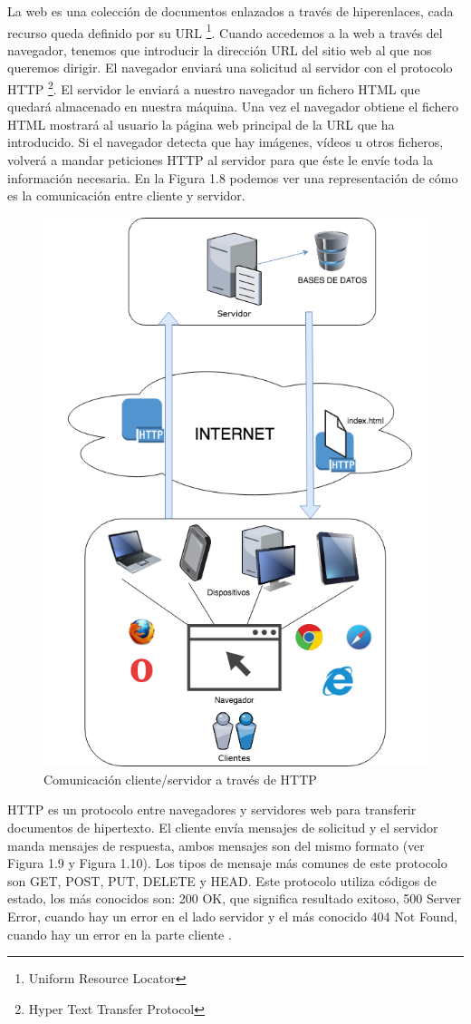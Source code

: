 La web es una colección de documentos enlazados a través de hiperenlaces, cada recurso queda definido por su URL \footnote{Uniform Resource Locator}. Cuando accedemos a la web a través del navegador, tenemos que introducir la dirección URL del sitio web al que nos queremos dirigir. El navegador enviará una solicitud al servidor con el protocolo HTTP \footnote{Hyper Text Transfer Protocol}. El servidor le enviará a nuestro navegador un fichero HTML que quedará almacenado en nuestra máquina. Una vez el navegador obtiene el fichero HTML mostrará al usuario la página web principal de la URL que ha introducido. Si el navegador detecta que hay imágenes, vídeos u otros ficheros, volverá a mandar peticiones HTTP al servidor para que éste le envíe toda la información necesaria. En la Figura 1.8 podemos ver una representación de cómo es la comunicación entre cliente y servidor.
\begin{figure}[H]
    \centering
    \includegraphics[width=0.45\columnwidth]{chapters/images/web.png}
    \caption{Comunicación cliente/servidor a través de HTTP}
    \label{fig:httpprotocol}
\end{figure}
HTTP es un protocolo entre navegadores y servidores web para transferir documentos de hipertexto. El cliente envía mensajes de solicitud y el servidor manda mensajes de respuesta, ambos mensajes son del mismo formato (ver Figura 1.9 y Figura 1.10). Los tipos de mensaje más comunes de este protocolo son GET, POST, PUT, DELETE y HEAD. Este protocolo utiliza códigos de estado, los más conocidos son: 200 OK, que significa resultado exitoso, 500 Server Error, cuando hay un error en el lado servidor y el más conocido 404 Not Found, cuando hay un error en la parte cliente \cite{tecnologiasweb}.

